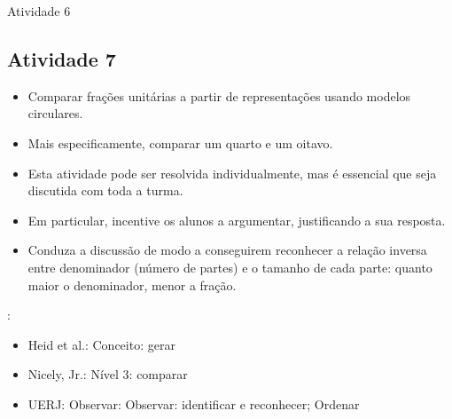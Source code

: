 \begin{multicols}{2}
\begin{resposta*}{Atividade 6}
\end{resposta*}

\subsection{Atividade 7}

  \vspace{.1cm}

\begin{itemize} %
    \item       Comparar frações unitárias a partir de representações usando modelos circulares.
    \item       Mais especificamente, comparar um quarto e um oitavo.
\end{itemize} %


  \vspace{.1cm}

  \vspace{.1cm}

\begin{itemize} %
    \item       Esta atividade pode ser resolvida individualmente, mas é essencial que seja discutida com toda a turma.
    \item       Em particular, incentive os alunos a argumentar, justificando a sua resposta.
    \item       Conduza a discussão de modo a conseguirem reconhecer a relação inversa entre denominador (número de partes) e o tamanho de cada parte: quanto maior o denominador, menor a fração.
\end{itemize} %


  \vspace{.1cm}

 \vspace{.1cm}:
\begin{itemize} %
    \item       Heid et al.: Conceito: gerar
    \item       Nicely, Jr.: Nível 3: comparar
    \item       UERJ: Observar: Observar: identificar e reconhecer; Ordenar
\end{itemize} %




\end{multicols}
